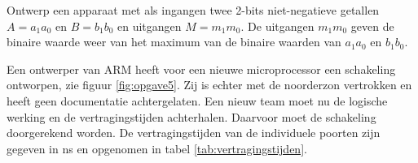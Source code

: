 \documentclass[a4paper,12pt,addpoints,fleqn,dutch,concept]{tisdexam}
\begin{document}
\begin{questions}


\question
\label{opg:opg4}
Ontwerp een apparaat met als ingangen twee 2-bits niet-negatieve getallen
$A = a_{1}a_{0}$ en $B = b_{1}b_{0}$ en uitgangen $M = m_{1}m_{0}$. De
uitgangen $m_{1}m_{0}$ geven de binaire waarde weer van het maximum
van de binaire waarden van $a_{1}a_{0}$ en $b_{1}b_{0}$.



\question
\label{opg:opg5}
Een ontwerper van ARM heeft voor een nieuwe microprocessor een schakeling
ontworpen, zie figuur \ref{fig:opgave5}. Zij is echter met de noorderzon
vertrokken en heeft geen documentatie achtergelaten. Een nieuw team moet nu de
logische werking en de vertragingstijden achterhalen. Daarvoor moet de
schakeling doorgerekend worden. De vertragingstijden van de individuele
poorten zijn gegeven in ns en opgenomen in tabel \ref{tab:vertragingstijden}.


\end{questions}
\end{document}
